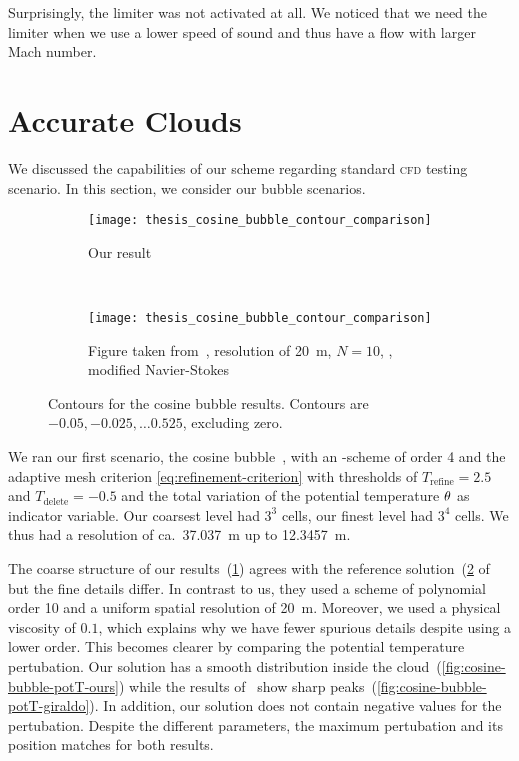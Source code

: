 Surprisingly, the limiter was not activated at all.
We noticed that we need the limiter when we use a lower speed of sound and thus have a flow with larger Mach number.

\section{Accurate Clouds}\label{sec:results-cloud}
We discussed the capabilities of our scheme regarding standard \textsc{cfd} testing scenario.
In this section, we consider our bubble scenarios.
\begin{figure}[htb]
  \centering
  \begin{subfigure}[t]{0.5\textwidth}
    \centering
    \texttt{[image: thesis\_cosine\_bubble\_contour\_comparison]}
    \caption{\label{fig:cosine-bubble-contour-ours}%
      Our result}
  \end{subfigure}~%
  \begin{subfigure}[t]{0.5\textwidth}
    \centering
    \texttt{[image: thesis\_cosine\_bubble\_contour\_comparison]}
    \caption{\label{fig:cosine-bubble-contour-giraldo}%
      Figure taken from~\cite{giraldo2008study}, resolution of \SI{20}{\m}, $N = 10$, \dg{}, modified Navier-Stokes} %
  \end{subfigure}
  \caption{\label{fig:cosine-bubble-contour}%
    Contours for the cosine bubble results.
    Contours are $-0.05, -0.025, \ldots 0.525$, excluding zero.
  }
\end{figure}
We ran our first scenario, the cosine bubble~, with an \aderdg{}-scheme of order 4 and the adaptive mesh criterion \cref{eq:refinement-criterion} with thresholds of $T_\text{refine} = 2.5$ and $T_\text{delete} = -0.5$ and the total variation of the potential temperature $\theta$ as indicator variable.
Our coarsest level had $3^3$ cells, our finest level had $3^4$ cells.
We thus had a resolution of ca.\ \SI{37.037}{\m} up to \SI{12.3457}{\m}.

The coarse structure of our results~(\cref{fig:cosine-bubble-contour-ours}) agrees with the reference solution~(\cref{fig:cosine-bubble-contour-giraldo} of~\cite{giraldo2008study} but the fine details differ.
In contrast to us, they used a scheme of polynomial order 10 and a uniform spatial resolution of \SI{20}{\m}.
Moreover, we used a physical viscosity of $0.1$, which explains why we have fewer spurious details despite using a lower order.
This becomes clearer by comparing the potential temperature pertubation.
Our solution has a smooth distribution inside the cloud~(\cref{fig:cosine-bubble-potT-ours}) while the results of~\cite{giraldo2008study} show sharp peaks~(\cref{fig:cosine-bubble-potT-giraldo}).
In addition, our solution does not contain negative values for the pertubation.
Despite the different parameters, the maximum pertubation and its position matches for both results.

